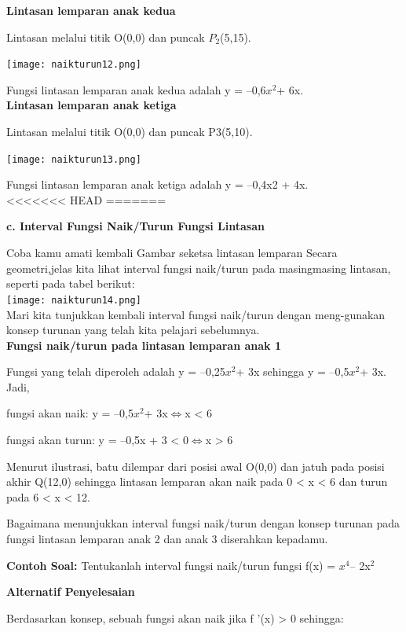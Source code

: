 \documentclass[11pt,fleqn]{book} %
\begin{document}
\textbf{Lintasan lemparan anak kedua}

Lintasan melalui titik O(0,0) dan puncak $P_{2}$(5,15).

\texttt{[image: naikturun12.png]}

Fungsi lintasan lemparan anak kedua adalah y = –0,6$x^{2} $+ 6x.\\

\textbf{Lintasan lemparan anak ketiga}

Lintasan melalui titik O(0,0) dan puncak P3(5,10).

\texttt{[image: naikturun13.png]}

Fungsi lintasan lemparan anak ketiga adalah y = –0,4x2 +
4x.\\
<<<<<<< HEAD
=======

\textbf{c. Interval Fungsi Naik/Turun Fungsi Lintasan}

Coba kamu amati kembali Gambar seketsa lintasan lemparan Secara geometri,jelas kita lihat interval fungsi naik/turun pada masingmasing lintasan, seperti pada tabel berikut:\\

\texttt{[image: naikturun14.png]}\\

Mari kita tunjukkan kembali interval fungsi naik/turun dengan meng-gunakan konsep turunan yang telah kita pelajari sebelumnya.\\

\textbf{Fungsi naik/turun pada lintasan lemparan anak 1}

Fungsi yang telah diperoleh adalah y = –0,25$x^{2} $+ 3x sehingga y = –0,5$x^{2} $+ 3x. Jadi,

fungsi akan naik: y = –0,5$x^{2} $+ 3x$ \Leftrightarrow $x < 6

fungsi akan turun: y = –0,5x + 3 < 0$ \Leftrightarrow $x > 6

Menurut ilustrasi, batu dilempar dari posisi awal O(0,0) dan jatuh pada posisi akhir Q(12,0) sehingga lintasan lemparan akan naik pada 0 < x < 6 dan turun pada 6 < x < 12.

Bagaimana menunjukkan interval fungsi naik/turun
dengan konsep turunan pada fungsi lintasan lemparan
anak 2 dan anak 3 diserahkan kepadamu.

\textbf {Contoh Soal:} 
Tentukanlah interval fungsi naik/turun fungsi f(x) = $x^{4} $– 2x$^{2}$

\textbf{Alternatif Penyelesaian}

Berdasarkan konsep, sebuah fungsi akan naik jika f '(x) > 0 sehingga:
\end{document}
